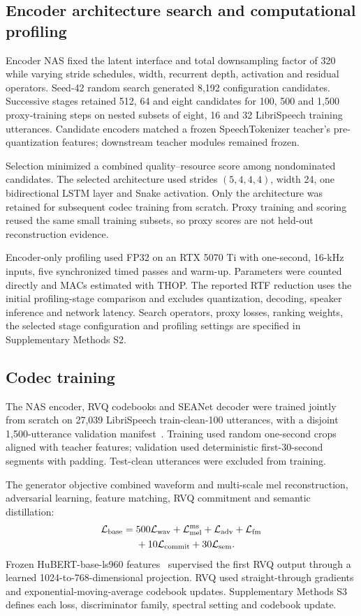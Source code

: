 \documentclass[final,5p,times,twocolumn]{elsarticle}
\begin{document}
\subsection{Encoder architecture search and computational profiling}
Encoder NAS fixed the latent interface and total downsampling factor of 320 while varying stride schedules, width, recurrent depth, activation and residual operators. Seed-42 random search generated 8,192 configuration candidates. Successive stages retained 512, 64 and eight candidates for 100, 500 and 1,500 proxy-training steps on nested subsets of eight, 16 and 32 LibriSpeech training utterances. Candidate encoders matched a frozen SpeechTokenizer teacher's pre-quantization features; downstream teacher modules remained frozen.

Selection minimized a combined quality--resource score among nondominated candidates. The selected architecture used strides $(5,4,4,4)$, width 24, one bidirectional LSTM layer and Snake activation. Only the architecture was retained for subsequent codec training from scratch. Proxy training and scoring reused the same small training subsets, so proxy scores are not held-out reconstruction evidence.

Encoder-only profiling used FP32 on an RTX 5070 Ti with one-second, 16-kHz inputs, five synchronized timed passes and warm-up. Parameters were counted directly and MACs estimated with THOP. The reported RTF reduction uses the initial profiling-stage comparison and excludes quantization, decoding, speaker inference and network latency. Search operators, proxy losses, ranking weights, the selected stage configuration and profiling settings are specified in Supplementary Methods S2.

\subsection{Codec training}
The NAS encoder, RVQ codebooks and SEANet decoder were trained jointly from scratch on 27,039 LibriSpeech train-clean-100 utterances, with a disjoint 1,500-utterance validation manifest~\cite{librispeech}. Training used random one-second crops aligned with teacher features; validation used deterministic first-30-second segments with padding. Test-clean utterances were excluded from training.

The generator objective combined waveform and multi-scale mel reconstruction, adversarial learning, feature matching, RVQ commitment and semantic distillation:
\begin{equation}
\begin{split}
 \mathcal L_{\rm base}={}&500\mathcal L_{\rm wav}
 +\mathcal L_{\rm mel}^{\rm ms}
 +\mathcal L_{\rm adv}+\mathcal L_{\rm fm}\\
 &+10\mathcal L_{\rm commit}+30\mathcal L_{\rm sem}.
\end{split}
\end{equation}
Frozen HuBERT-base-ls960 features~\cite{hubert} supervised the first RVQ output through a learned 1024-to-768-dimensional projection. RVQ used straight-through gradients and exponential-moving-average codebook updates. Supplementary Methods S3 defines each loss, discriminator family, spectral setting and codebook update.
\end{document}
